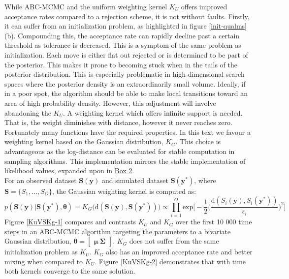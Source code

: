 While ABC-MCMC and the uniform weighting kernel $K_U$ offers improved acceptance rates compared to a rejection scheme, it is not without faults. Firstly, it can suffer from an initialization problem, as highlighted in figure \ref{init-qualms}(b). Compounding this, the acceptance rate can rapidly decline past a certain threshold as tolerance is decreased. This is a symptom of the same problem as initialization. Each move is either flat out rejected or is determined to be part of the posterior. This makes it prone to becoming stuck when in the tails of the posterior distribution. This is especially problematic in high-dimensional search spaces where the posterior density is an extraordinarily small volume. Ideally, if in a poor spot, the algorithm should be able to make local transitions toward an area of high probability density. However, this adjustment will involve abandoning the $K_U$. A weighting kernel which offers infinite support is needed. That is, the weight diminishes with distance, however it never reaches zero. Fortunately many functions have the required properties. In this text we favour a  weighting kernel based on the Gaussian distribution, $K_G$. This choice is advantageous as the log-distance can be evaluated for stable computation in sampling algorithms. This implementation mirrors the stable implementation of likelihood values, expanded upon in \hyperref[Box2]{Box 2}.\\

For an observed dataset $\bm{S}(\bm{y})$ and simulated dataset $\bm{S}(\bm{y^*})$, where $\bm{S} = \{S_1,\dots,S_O\}$, the Gaussian weighting kernel is computed as:
\begin{equation}
p(\bm{S}(\bm{y})|\bm{S}(\bm{y^*}),\bm{\theta}) = K_G\big(\text{d}(\bm{S}(\bm{y}),\bm{S}(\bm{y^*}))\big) \propto \prod_{i = 1}^{O} \text{exp}\Big[-\frac{1}{2}\Big(\frac{\text{d}(S_i(\bm{y}),S_i(\bm{y^*}))}{\epsilon_i}\Big)^2\Big]
\end{equation}
Figure \ref{KuVSKg-1} compares and contrasts $K_U$ and $K_G$ over the first 10 000 time steps in an ABC-MCMC algorithm targeting the parameters to a bivariate Gaussian distribution, $\bm{\theta} = \begin{bmatrix}
\bm{\mu}\ \bm{\Sigma}
\end{bmatrix}$. $K_G$ does not suffer from the same initialization problem as $K_U$. $K_G$ also has an improved acceptance rate and better mixing when compared to $K_U$. Figure \ref{KuVSKg-2} demonstrates that with time both kernels converge to the same solution.\\

